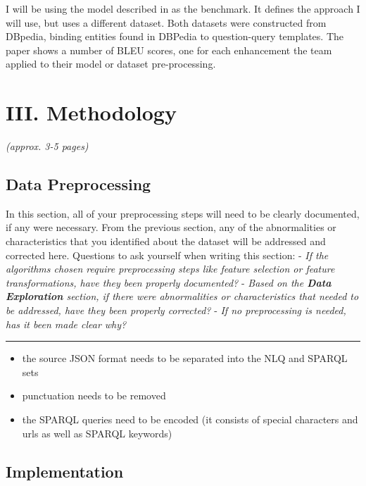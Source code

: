 \documentclass[12pt]{article}
\begin{document}
\begin{enumerate}
I will be using the model described in \cite{soru2018neural} as the
benchmark. It defines the approach I will use, but uses a different
dataset. Both datasets were constructed from DBpedia, binding entities
found in DBPedia to question-query templates. The paper shows a number
of BLEU scores, one for each enhancement the team applied to their model
or dataset pre-processing.

\section{III. Methodology}\label{iii.-methodology}

\emph{(approx. 3-5 pages)}

\subsection{Data Preprocessing}\label{data-preprocessing}

In this section, all of your preprocessing steps will need to be clearly
documented, if any were necessary. From the previous section, any of the
abnormalities or characteristics that you identified about the dataset
will be addressed and corrected here. Questions to ask yourself when
writing this section: - \emph{If the algorithms chosen require
preprocessing steps like feature selection or feature transformations,
have they been properly documented?} - \emph{Based on the \textbf{Data
Exploration} section, if there were abnormalities or characteristics
that needed to be addressed, have they been properly corrected?} -
\emph{If no preprocessing is needed, has it been made clear why?}

\begin{center}\rule{0.5\linewidth}{\linethickness}\end{center}

\begin{itemize}
\item
  the source JSON format needs to be separated into the NLQ and SPARQL
  sets
\item
  punctuation needs to be removed
\item
  the SPARQL queries need to be encoded (it consists of special
  characters and urls as well as SPARQL keywords)
\end{itemize}

\subsection{Implementation}\label{implementation}


\end{enumerate}
\end{document}

